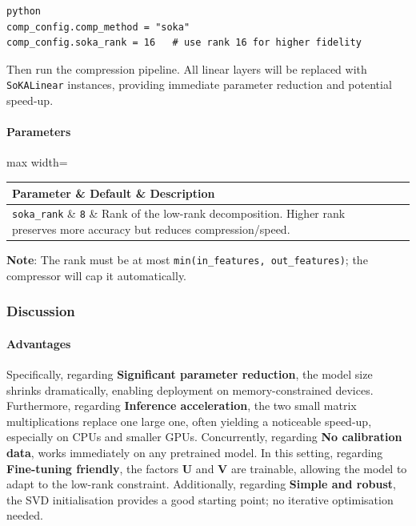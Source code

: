 \vspace{0.5em}
\begin{mdframed}[backgroundcolor=codebg, linecolor=codeframe, linewidth=1pt, roundcorner=4pt, innerleftmargin=2pt, innerrightmargin=5pt, innertopmargin=5pt, innerbottommargin=5pt]
\begin{lstlisting}
python
comp_config.comp_method = "soka"
comp_config.soka_rank = 16   # use rank 16 for higher fidelity
\end{lstlisting}
\end{mdframed}
\vspace{0.5em}

Then run the compression pipeline. All linear layers will be replaced with \texttt{SoKALinear} instances, providing immediate parameter reduction and potential speed-up.

\paragraph{Parameters}

\begin{center}
\begin{adjustbox}{max width=\columnwidth}
\renewcommand{\arraystretch}{1.2}
\begin{tabular}{lll}
\toprule
Parameter \& Default \& Description \\
\midrule
\texttt{soka\_rank} \& \texttt{8} \& Rank of the low-rank decomposition. Higher rank preserves more accuracy but reduces compression/speed. \\

\bottomrule
\end{tabular}
\end{adjustbox}
\end{center}
\textbf{Note}: The rank must be at most \texttt{min(in\_features, out\_features)}; the compressor will cap it automatically.


\subsubsection*{Discussion}

\paragraph{Advantages}

Specifically, regarding \textbf{Significant parameter reduction}, the model size shrinks dramatically, enabling deployment on memory-constrained devices. Furthermore, regarding \textbf{Inference acceleration}, the two small matrix multiplications replace one large one, often yielding a noticeable speed-up, especially on CPUs and smaller GPUs. Concurrently, regarding \textbf{No calibration data}, works immediately on any pretrained model. In this setting, regarding \textbf{Fine-tuning friendly}, the factors \textbf{U} and \textbf{V} are trainable, allowing the model to adapt to the low-rank constraint. Additionally, regarding \textbf{Simple and robust}, the SVD initialisation provides a good starting point; no iterative optimisation needed.


